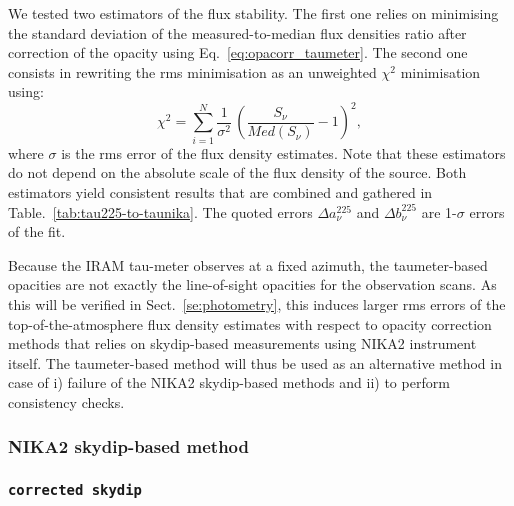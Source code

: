 We tested two estimators of the flux stability. The first one relies
on minimising the standard deviation of the measured-to-median flux
densities ratio after correction of the opacity using
Eq.~\ref{eq:opacorr_taumeter}. The second one consists in rewriting
the rms minimisation as an unweighted $\chi^2$ minimisation using:
\begin{equation}
\chi^2 = \sum_{i=1}^{N} \frac{1}{\sigma^2} \, \left( \frac{S_\nu}{Med(S_\nu)} -1 \right)^2,  
\end{equation}
where $\sigma$ is the rms error of the flux density estimates. Note
that these estimators do not depend on
the absolute scale of the flux density of the source. Both estimators
yield consistent results that are combined and gathered in
Table.~\ref{tab:tau225-to-taunika}. The quoted errors
$\Delta a_\nu^{225}$ and $\Delta b_\nu^{225}$ are 1-$\sigma$ errors of
the fit.

Because the IRAM tau-meter observes at a fixed azimuth, the
taumeter-based opacities are not exactly the line-of-sight opacities for
the observation scans. As this will be verified in
Sect.~\ref{se:photometry}, this induces larger rms errors of
the top-of-the-atmosphere flux density estimates with respect to
opacity correction methods that relies on skydip-based measurements using
NIKA2 instrument itself. The taumeter-based method will thus be used
as an alternative method in case of i) failure of the NIKA2 skydip-based
methods and ii) to perform consistency checks.



\subsubsection{NIKA2 skydip-based method}
\label{se:skydip-method}


\subsubsection{{\tt corrected skydip}}
\label{se:corrected-skydip}
